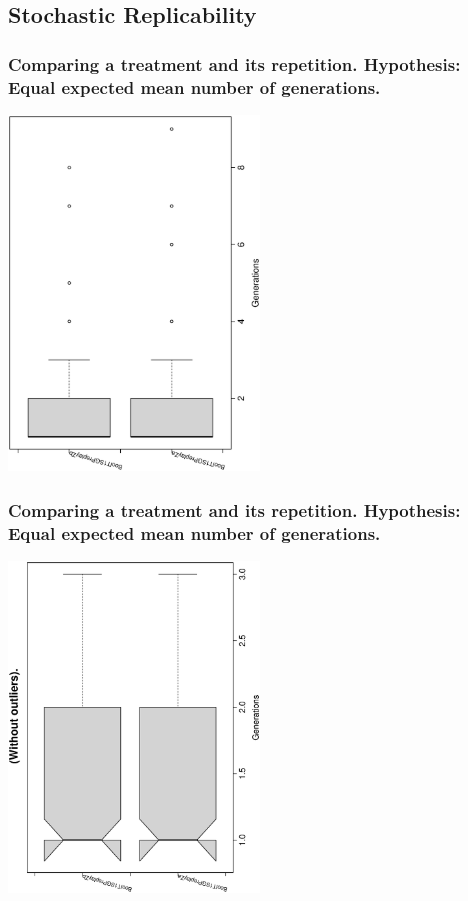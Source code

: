 \documentclass[18pt,c]{beamer}
\begin{document}
\subsection{Stochastic Replicability}
 \begin{frame}
 \frametitle{ Comparing a treatment and its repetition. Hypothesis: Equal expected mean number of generations. }
 \begin{center}
\includegraphics[width=0.5\textwidth, angle=-90]
{ExpCboxplottGenerations002.eps}
 \end{center}
 \label{ExpCboxplottGenerations002.eps}  
 \end{frame}

 \begin{frame}
 \frametitle{ Comparing a treatment and its repetition. Hypothesis: Equal expected mean number of generations. }
 \begin{center}
\includegraphics[width=0.5\textwidth, angle=-90]
{ExpCboxplottGenerations003.eps}
 \end{center}
 \label{ExpCboxplottGenerations003.eps}  
 \end{frame}
\end{document}
